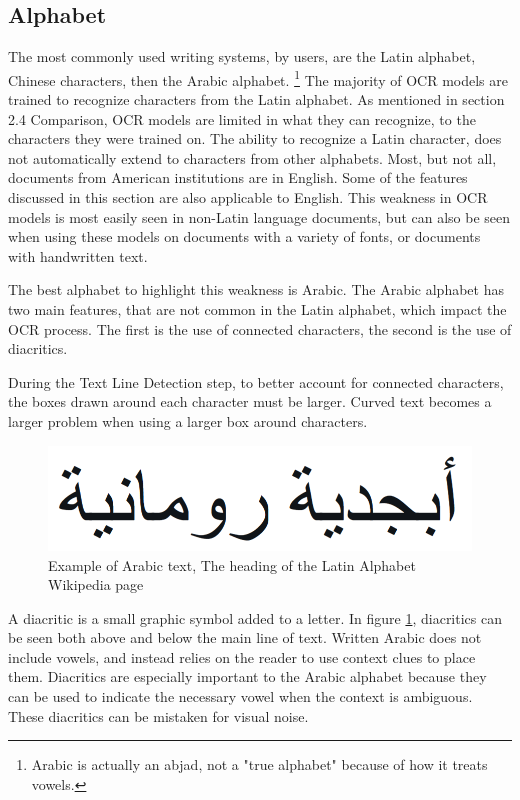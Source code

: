 \documentclass[sigplan,screen,nonacm]{acmart-tagged}
\begin{document}
\subsection{Alphabet}
\label{Alphabet}
The most commonly used writing systems, by users, are the Latin alphabet, Chinese characters, then the Arabic alphabet.\cite{Vaughan:2025} \footnote{Arabic is actually an abjad, not a "true alphabet" because of how it treats vowels.}
The majority of OCR models are trained to recognize characters from the Latin alphabet.
As mentioned in section 2.4 Comparison, OCR models are limited in what they can recognize, to the characters they were trained on.
The ability to recognize a Latin character, does not automatically extend to characters from other alphabets. 
Most, but not all, documents from American institutions are in English. 
Some of the features discussed in this section are also applicable to English. 
This weakness in OCR models is most easily seen in non-Latin language documents, but can also be seen when using these models on documents with a variety of fonts, or documents with handwritten text.

The best alphabet to highlight this weakness is Arabic.
The Arabic alphabet has two main features, that are not common in the Latin alphabet, which impact the OCR process. The first is the use of connected characters, the second is the use of diacritics. 

During the Text Line Detection step, to better account for connected characters, the boxes drawn around each character must be larger. Curved text becomes a larger problem when using a larger box around characters.\citep{Fateh:2024}

\begin{figure}
  \includegraphics[width=\linewidth]{arabic.png}
  \caption{Example of Arabic text, The heading of the Latin Alphabet Wikipedia page}
  \label{fig:alphabet}
\end{figure}

A diacritic is a small graphic symbol added to a letter. In figure \ref{fig:alphabet}, diacritics can be seen both above and below the main line of text. Written Arabic does not include vowels, and instead relies on the reader to use context clues to place them. Diacritics are especially important to the Arabic alphabet because they can be used to indicate the necessary vowel when the context is ambiguous.\cite{ArabicWiki:2025} These diacritics can be mistaken for visual noise.
\end{document}
